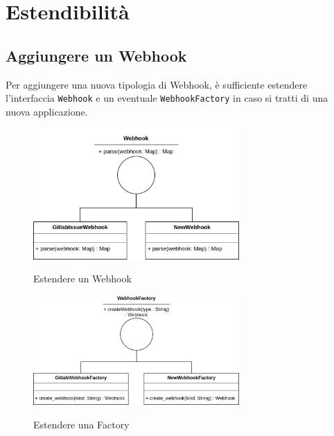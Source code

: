 \section{Estendibilità}

\subsection{Aggiungere un Webhook}

Per aggiungere una nuova tipologia di Webhook, è sufficiente estendere l'interfaccia \texttt{Webhook}
e un eventuale \texttt{WebhookFactory} in caso si tratti di una nuova applicazione.

\begin{figure}[H]
    \centering
    \includegraphics[width=0.7\textwidth]{img/EstensioneWebhook.png}\\
    \caption{Estendere un Webhook}
\end{figure}


\begin{figure}[H]
    \centering
    \includegraphics[width=0.7\textwidth]{img/EstensioneFactory.png}\\
    \caption{Estendere una Factory}
\end{figure}
